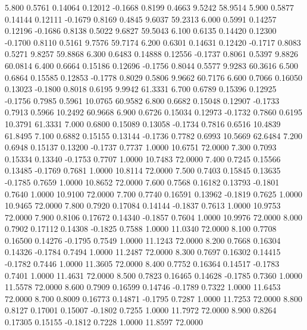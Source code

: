    5.800   0.5761   0.14064   0.12012  -0.1668   0.8199   0.4663   9.5242  58.9514
   5.900   0.5877   0.14144   0.12111  -0.1679   0.8169   0.4845   9.6037  59.2313
   6.000   0.5991   0.14257   0.12196  -0.1686   0.8138   0.5022   9.6827  59.5043
   6.100   0.6135   0.14420   0.12300  -0.1700   0.8110   0.5161   9.7576  59.7174
   6.200   0.6301   0.14631   0.12420  -0.1717   0.8083   0.5271   9.8257  59.8868
   6.300   0.6483   0.14888   0.12556  -0.1737   0.8061   0.5397   9.8826  60.0814
   6.400   0.6664   0.15186   0.12696  -0.1756   0.8044   0.5577   9.9283  60.3616
   6.500   0.6864   0.15585   0.12853  -0.1778   0.8029   0.5806   9.9662  60.7176
   6.600   0.7066   0.16050   0.13023  -0.1800   0.8018   0.6195   9.9942  61.3331
   6.700   0.6789   0.15396   0.12925  -0.1756   0.7985   0.5961  10.0765  60.9582
   6.800   0.6682   0.15048   0.12907  -0.1733   0.7913   0.5966  10.2492  60.9668
   6.900   0.6726   0.15034   0.12973  -0.1732   0.7860   0.6195  10.3791  61.3331
   7.000   0.6800   0.15089   0.13058  -0.1734   0.7816   0.6516  10.4839  61.8495
   7.100   0.6882   0.15155   0.13144  -0.1736   0.7782   0.6993  10.5669  62.6484
   7.200   0.6948   0.15137   0.13200  -0.1737   0.7737   1.0000  10.6751  72.0000
   7.300   0.7093   0.15334   0.13340  -0.1753   0.7707   1.0000  10.7483  72.0000
   7.400   0.7245   0.15566   0.13485  -0.1769   0.7681   1.0000  10.8114  72.0000
   7.500   0.7403   0.15845   0.13635  -0.1785   0.7659   1.0000  10.8652  72.0000
   7.600   0.7568   0.16182   0.13793  -0.1801   0.7640   1.0000  10.9100  72.0000
   7.700   0.7740   0.16591   0.13962  -0.1819   0.7625   1.0000  10.9465  72.0000
   7.800   0.7920   0.17084   0.14144  -0.1837   0.7613   1.0000  10.9753  72.0000
   7.900   0.8106   0.17672   0.14340  -0.1857   0.7604   1.0000  10.9976  72.0000
   8.000   0.7902   0.17112   0.14308  -0.1825   0.7588   1.0000  11.0340  72.0000
   8.100   0.7708   0.16500   0.14276  -0.1795   0.7549   1.0000  11.1243  72.0000
   8.200   0.7668   0.16304   0.14326  -0.1784   0.7494   1.0000  11.2487  72.0000
   8.300   0.7697   0.16302   0.14415  -0.1782   0.7446   1.0000  11.3605  72.0000
   8.400   0.7752   0.16364   0.14517  -0.1783   0.7401   1.0000  11.4631  72.0000
   8.500   0.7823   0.16465   0.14628  -0.1785   0.7360   1.0000  11.5578  72.0000
   8.600   0.7909   0.16599   0.14746  -0.1789   0.7322   1.0000  11.6453  72.0000
   8.700   0.8009   0.16773   0.14871  -0.1795   0.7287   1.0000  11.7253  72.0000
   8.800   0.8127   0.17001   0.15007  -0.1802   0.7255   1.0000  11.7972  72.0000
   8.900   0.8264   0.17305   0.15155  -0.1812   0.7228   1.0000  11.8597  72.0000
